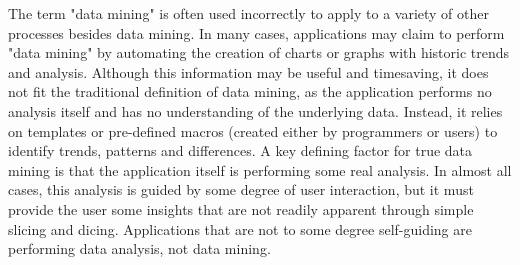 The term "data mining" is often used incorrectly to apply to a variety of other processes besides data mining. In many cases, applications may claim to perform "data mining" by automating the creation of charts or graphs with historic trends and analysis. Although this information may be useful and timesaving, it does not fit the traditional definition of data mining, as the application performs no analysis itself and has no understanding of the underlying data. Instead, it relies on templates or pre-defined macros (created either by programmers or users) to identify trends, patterns and differences. A key defining factor for true data mining is that the application itself is performing some real analysis. In almost all cases, this analysis is guided by some degree of user interaction, but it must provide the user some insights that are not readily apparent through simple slicing and dicing. Applications that are not to some degree self-guiding are performing data analysis, not data mining.
